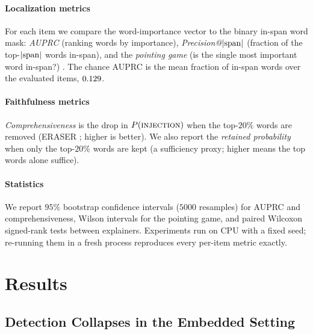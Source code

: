 \documentclass{ieeeaccess}
\begin{document}
\paragraph*{Localization metrics}
For each item we compare the word-importance vector to the binary in-span word mask: \emph{AUPRC} (ranking words by importance), \emph{Precision@$|{\rm span}|$} (fraction of the top-$|{\rm span}|$ words in-span), and the \emph{pointing game} (is the single most important word in-span?) \cite{pointing2018}. The chance AUPRC is the mean fraction of in-span words over the evaluated items, $0.129$.

\paragraph*{Faithfulness metrics}
\emph{Comprehensiveness} is the drop in $P(\textsc{injection})$ when the top-$20\%$ words are removed (ERASER \cite{deyoung2020}; higher is better). We also report the \emph{retained probability} when only the top-$20\%$ words are kept (a sufficiency proxy; higher means the top words alone suffice).

\paragraph*{Statistics}
We report $95\%$ bootstrap confidence intervals ($5000$ resamples) for AUPRC and comprehensiveness, Wilson intervals for the pointing game, and paired Wilcoxon signed-rank tests between explainers. Experiments run on CPU with a fixed seed; re-running them in a fresh process reproduces every per-item metric exactly.

\section{Results}
\label{sec:results}

\subsection{Detection Collapses in the Embedded Setting}
\end{document}

